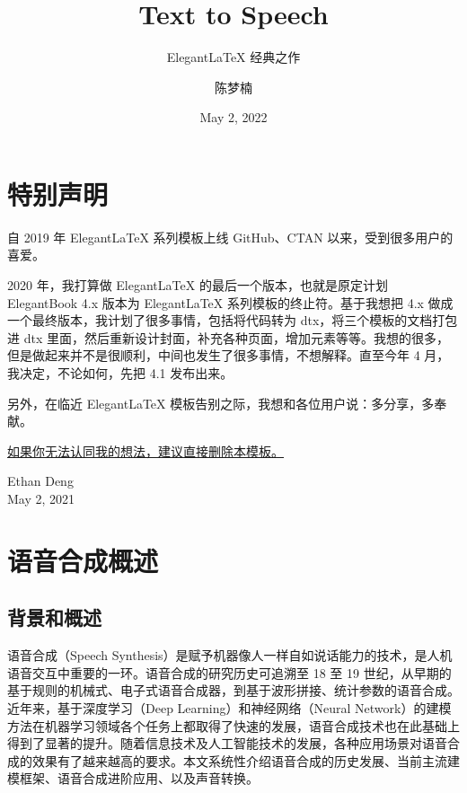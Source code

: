 \documentclass[cn,10pt,math=newtx,citestyle=gb7714-2015,bibstyle=gb7714-2015]{elegantbook}
\title{Text to Speech}
\subtitle{Elegant\LaTeX{} 经典之作}
\author{陈梦楠}
\institute{Elegant\LaTeX{} Program}
\date{May 2, 2022}
\begin{document}
\maketitle
\frontmatter

\chapter*{特别声明}


自 2019 年 Elegant\LaTeX{} 系列模板上线 GitHub、CTAN 以来，受到很多用户的喜爱。

2020 年，我打算做 Elegant\LaTeX{} 的最后一个版本，也就是原定计划 ElegantBook 4.x 版本为 Elegant\LaTeX{} 系列模板的终止符。基于我想把 4.x 做成一个最终版本，我计划了很多事情，包括将代码转为 dtx，将三个模板的文档打包进 dtx 里面，然后重新设计封面，补充各种页面，增加元素等等。我想的很多，但是做起来并不是很顺利，中间也发生了很多事情，不想解释。直至今年 4 月，我决定，不论如何，先把 4.1 发布出来。

\vskip 0.5cm

另外，在临近 Elegant\LaTeX{} 模板告别之际，我想和各位用户说：多分享，多奉献。

\vskip 0.5cm

\underline{如果你无法认同我的想法，建议直接删除本模板。}

\vskip 1.5cm

\begin{flushright}
Ethan Deng\\
May 2, 2021
\end{flushright}

\tableofcontents

\mainmatter

\chapter{语音合成概述}

\section{背景和概述}
语音合成（Speech Synthesis）是赋予机器像人一样自如说话能力的技术，是人机语音交互中重要的一环。语音合成的研究历史可追溯至 18 至 19 世纪，从早期的基于规则的机械式、电子式语音合成器，到基于波形拼接、统计参数的语音合成。近年来，基于深度学习（Deep Learning）和神经网络（Neural Network）的建模方法在机器学习领域各个任务上都取得了快速的发展，语音合成技术也在此基础上得到了显著的提升。随着信息技术及人工智能技术的发展，各种应用场景对语音合成的效果有了越来越高的要求。本文系统性介绍语音合成的历史发展、当前主流建模框架、语音合成进阶应用、以及声音转换。
\end{document}

